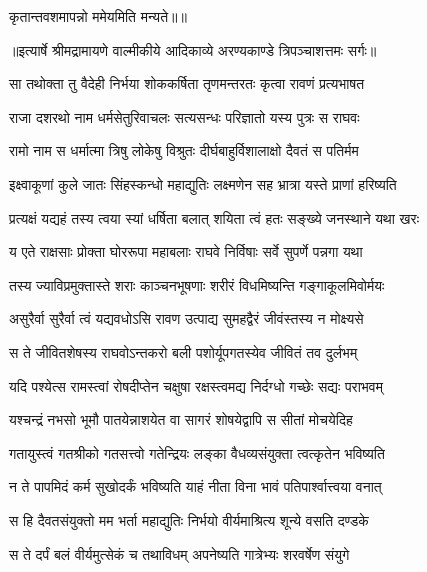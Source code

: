 {कृतान्तवशमापन्नो ममेयमिति मन्यते॥॥} %

\addtocounter{shlokacount}{1}


{॥इत्यार्षे श्रीमद्रामायणे वाल्मीकीये आदिकाव्ये अरण्यकाण्डे त्रिपञ्चाशत्तमः सर्गः॥}


\twolineshloka
{सा तथोक्ता तु वैदेही निर्भया शोककर्षिता}
{तृणमन्तरतः कृत्वा रावणं प्रत्यभाषत} %

\twolineshloka
{राजा दशरथो नाम धर्मसेतुरिवाचलः}
{सत्यसन्धः परिज्ञातो यस्य पुत्रः स राघवः} %

\twolineshloka
{रामो नाम स धर्मात्मा त्रिषु लोकेषु विश्रुतः}
{दीर्घबाहुर्विशालाक्षो दैवतं स पतिर्मम} %

\twolineshloka
{इक्ष्वाकूणां कुले जातः सिंहस्कन्धो महाद्युतिः}
{लक्ष्मणेन सह भ्रात्रा यस्ते प्राणां हरिष्यति} %

\twolineshloka
{प्रत्यक्षं यद्यहं तस्य त्वया स्यां धर्षिता बलात्}
{शयिता त्वं हतः सङ्ख्ये जनस्थाने यथा खरः} %

\twolineshloka
{य एते राक्षसाः प्रोक्ता घोररूपा महाबलाः}
{राघवे निर्विषाः सर्वे सुपर्णे पन्नगा यथा} %

\twolineshloka
{तस्य ज्याविप्रमुक्तास्ते शराः काञ्चनभूषणाः}
{शरीरं विधमिष्यन्ति गङ्गाकूलमिवोर्मयः} %

\twolineshloka
{असुरैर्वा सुरैर्वा त्वं यद्यवधोऽसि रावण}
{उत्पाद्य सुमहद्वैरं जीवंस्तस्य न मोक्ष्यसे} %

\twolineshloka
{स ते जीवितशेषस्य राघवोऽन्तकरो बली}
{पशोर्यूपगतस्येव जीवितं तव दुर्लभम्} %

\twolineshloka
{यदि पश्येत्स रामस्त्वां रोषदीप्तेन चक्षुषा}
{रक्षस्त्वमद्य निर्दग्धो गच्छेः सद्यः पराभवम्} %

\twolineshloka
{यश्चन्द्रं नभसो भूमौ पातयेन्नाशयेत वा}
{सागरं शोषयेद्वापि स सीतां मोचयेदिह} %

\twolineshloka
{गतायुस्त्वं गतश्रीको गतसत्त्वो गतेन्द्रियः}
{लङ्का वैधव्यसंयुक्ता त्वत्कृतेन भविष्यति} %

\twolineshloka
{न ते पापमिदं कर्म सुखोदर्कं भविष्यति}
{याहं नीता विना भावं पतिपार्श्वात्त्वया वनात्} %

\twolineshloka
{स हि दैवतसंयुक्तो मम भर्ता महाद्युतिः}
{निर्भयो वीर्यमाश्रित्य शून्ये वसति दण्डके} %

\twolineshloka
{स ते दर्पं बलं वीर्यमुत्सेकं च तथाविधम्}
{अपनेष्यति गात्रेभ्यः शरवर्षेण संयुगे} %

